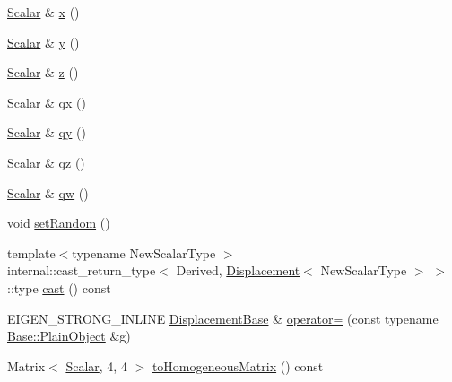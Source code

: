\begin{DoxyCompactItemize}
\item 
\hyperlink{class_displacement_base_a978caf313131fd9d221a856a2e4a80ad}{Scalar} \& \hyperlink{class_displacement_base_a1f29ca444e3e267eb8984cde3173d4e5}{x} ()
\item 
\hyperlink{class_displacement_base_a978caf313131fd9d221a856a2e4a80ad}{Scalar} \& \hyperlink{class_displacement_base_abe7f6f7ce47a153aec93e1b001bc700f}{y} ()
\item 
\hyperlink{class_displacement_base_a978caf313131fd9d221a856a2e4a80ad}{Scalar} \& \hyperlink{class_displacement_base_af542c09c615b88965d96397c546fcf16}{z} ()
\item 
\hyperlink{class_displacement_base_a978caf313131fd9d221a856a2e4a80ad}{Scalar} \& \hyperlink{class_displacement_base_a937faf4658311b1b17cd2e3b14ec8b15}{qx} ()
\item 
\hyperlink{class_displacement_base_a978caf313131fd9d221a856a2e4a80ad}{Scalar} \& \hyperlink{class_displacement_base_a89d0d16b7b3ea0d99f06278f83f1dc33}{qy} ()
\item 
\hyperlink{class_displacement_base_a978caf313131fd9d221a856a2e4a80ad}{Scalar} \& \hyperlink{class_displacement_base_a93797b5c38b58ef40d7c67b4cef86251}{qz} ()
\item 
\hyperlink{class_displacement_base_a978caf313131fd9d221a856a2e4a80ad}{Scalar} \& \hyperlink{class_displacement_base_a45e45394e32c27e52e10f4a5299ed13c}{qw} ()
\item 
void \hyperlink{class_displacement_base_a04542993e46456ee93c5767ad51cd1ba}{set\+Random} ()
\item 
{\footnotesize template$<$typename New\+Scalar\+Type $>$ }\\internal\+::cast\+\_\+return\+\_\+type$<$ Derived, \hyperlink{class_displacement}{Displacement}$<$ New\+Scalar\+Type $>$ $>$\+::type \hyperlink{class_displacement_base_a75e8a8cccb491a6b73ef6b2e0dd7f5db}{cast} () const
\item 
E\+I\+G\+E\+N\+\_\+\+S\+T\+R\+O\+N\+G\+\_\+\+I\+N\+L\+I\+NE \hyperlink{class_displacement_base}{Displacement\+Base} \& \hyperlink{class_displacement_base_a0fa68a3b52d098c1c9ba787e49de6fce}{operator=} (const typename \hyperlink{class_lie_group_base_a37b1d64048a2fa65b298801f6028c468}{Base\+::\+Plain\+Object} \&g)
\item 
Matrix$<$ \hyperlink{class_displacement_base_a978caf313131fd9d221a856a2e4a80ad}{Scalar}, 4, 4 $>$ \hyperlink{class_displacement_base_a4e720f3f8dde2e04033ea120a0180ba1}{to\+Homogeneous\+Matrix} () const
\end{DoxyCompactItemize}
